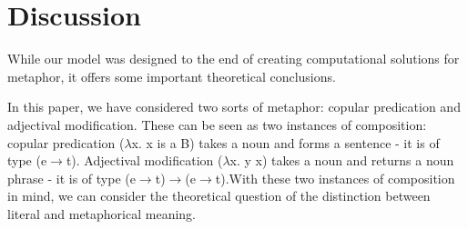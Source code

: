 \documentclass[10pt,letterpaper,twocolumn]{article}
\begin{document}








%


\section{Discussion} \label{discussion}

While our model was designed to the end of creating computational solutions for metaphor, it offers some important theoretical conclusions.

In this paper, we have considered two sorts of metaphor: copular predication and adjectival modification. These can be seen as two instances of composition: copular predication ($\lambda$x. x is a B) takes a noun and forms a sentence - it is of type (e$\to$t). Adjectival modification ($\lambda$x. y x) takes a noun and returns a noun phrase - it is of type (e$\to$t)$\to$(e$\to$t).With these two instances of composition in mind, we can consider the theoretical question of the distinction between literal and metaphorical meaning.
\end{document}
